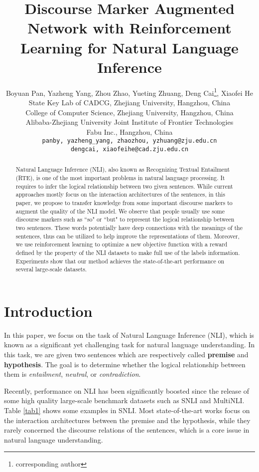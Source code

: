 \documentclass[11pt,letterpaper]{article}
\title{Discourse Marker Augmented Network with Reinforcement Learning for Natural Language Inference}
\author{Boyuan Pan, Yazheng Yang, Zhou Zhao, Yueting Zhuang, Deng Cai\thanks{corresponding author}, Xiaofei He\\
	State Key Lab of CADCG, Zhejiang University, Hangzhou, China\\
	College of Computer Science, Zhejiang University, Hangzhou, China\\
	Alibaba-Zhejiang University Joint Institute of Frontier Technologies\\
	Fabu Inc., Hangzhou, China\\
	{\tt panby, yazheng\_yang, zhaozhou, yzhuang@zju.edu.cn}\\
	{\tt dengcai, xiaofeihe@cad.zju.edu.cn} \\
}
\begin{document}
\maketitle

\begin{abstract}
Natural Language Inference (NLI), also known as Recognizing Textual Entailment (RTE), is one of the most important problems in natural language processing. It requires to infer the logical relationship between two given sentences. While current approaches mostly focus on the interaction architectures of the sentences, in this paper, we propose to transfer knowledge from some important discourse markers to augment the quality of the NLI model. We observe that people usually use some discourse markers such as ``so" or ``but" to represent the logical relationship between two sentences. These words potentially have deep connections with the meanings of the sentences, thus can be utilized to help improve the representations of them. Moreover, we use reinforcement learning to optimize a new objective function with a reward defined by the property of the NLI datasets to make full use of the labels information. Experiments show that our method achieves the state-of-the-art performance on several large-scale datasets.
\end{abstract}

\section{Introduction}
In this paper, we focus on the task of Natural Language Inference (NLI), which is known as a significant yet challenging task for natural language understanding. In this task, we are given two sentences which are respectively called \textbf{premise} and \textbf{hypothesis}. The goal is to determine whether the logical relationship between them is \emph{entailment}, \emph{neutral}, or \emph{contradiction}.

Recently, performance on NLI\cite{chen2017natural,gong2018natural,chen2017enhanced} has been significantly boosted since the release of some high quality large-scale benchmark datasets such as SNLI\cite{bowman2015large} and MultiNLI\cite{williams2017broad}. Table \ref{tab1} shows some examples in SNLI. Most state-of-the-art works focus on the interaction architectures between the premise and the hypothesis, while they rarely concerned the discourse relations of the sentences, which is a core issue in natural language understanding.
\end{document}
